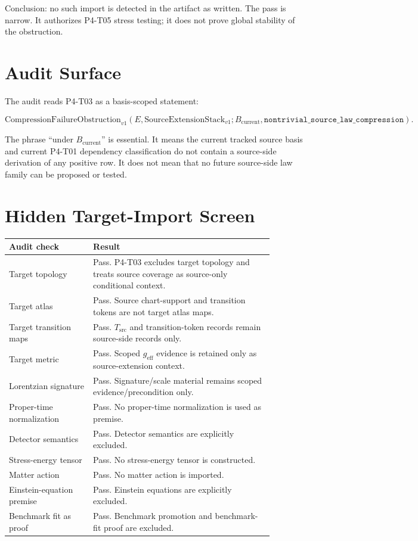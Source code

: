\documentclass[11pt]{article}
\newcommand{\geff}{g_{\mathrm{eff}}}
\newcommand{\Stack}{\mathrm{SourceExtensionStack}_{v1}}
\newcommand{\Obstruction}{\mathrm{CompressionFailureObstruction}_{v1}}
\newcommand{\Bcur}{B_{\mathrm{current}}}
\begin{document}
Conclusion: no such import is detected in the artifact as written. The pass
is narrow. It authorizes P4-T05 stress testing; it does not prove global
stability of the obstruction.

\section{Audit Surface}

The audit reads P4-T03 as a basis-scoped statement:

\[
  \Obstruction(E,\Stack;\Bcur,
  \texttt{nontrivial\_source\_law\_compression}).
\]

The phrase ``under \(\Bcur\)'' is essential. It means the current tracked
source basis and current P4-T01 dependency classification do not contain a
source-side derivation of any positive row. It does not mean that no future
source-side law family can be proposed or tested.

\section{Hidden Target-Import Screen}

\begin{longtable}{p{0.28\linewidth}p{0.60\linewidth}}
\toprule
Audit check & Result \\
\midrule
Target topology & Pass. P4-T03 excludes target topology and treats source coverage as source-only conditional context. \\
Target atlas & Pass. Source chart-support and transition tokens are not target atlas maps. \\
Target transition maps & Pass. \(T_{\mathrm{src}}\) and transition-token records remain source-side records only. \\
Target metric & Pass. Scoped \(\geff\) evidence is retained only as source-extension context. \\
Lorentzian signature & Pass. Signature/scale material remains scoped evidence/precondition only. \\
Proper-time normalization & Pass. No proper-time normalization is used as premise. \\
Detector semantics & Pass. Detector semantics are explicitly excluded. \\
Stress-energy tensor & Pass. No stress-energy tensor is constructed. \\
Matter action & Pass. No matter action is imported. \\
Einstein-equation premise & Pass. Einstein equations are explicitly excluded. \\
Benchmark fit as proof & Pass. Benchmark promotion and benchmark-fit proof are excluded. \\
\bottomrule
\end{longtable}
\end{document}

